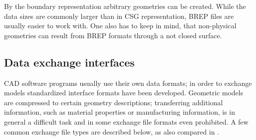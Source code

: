 By the boundary representation arbitrary geometries can be created. While the data sizes are commonly larger than in CSG representation, BREP files are usually easier to work with. One also has to keep in mind, that non-physical geometries can result from BREP formats through a not closed surface.
\subsection{Data exchange interfaces}
CAD software programs usually use their own data formats; in order to exchange models standardized interface formats have been developed. Geometric models are compressed to certain geometry descriptions; transferring additional information, such as material properties or manufacturing information, is in general a difficult task and in some exchange file formats even prohibited. A few common exchange file types are described below, as also compared in \cite{STL}.
